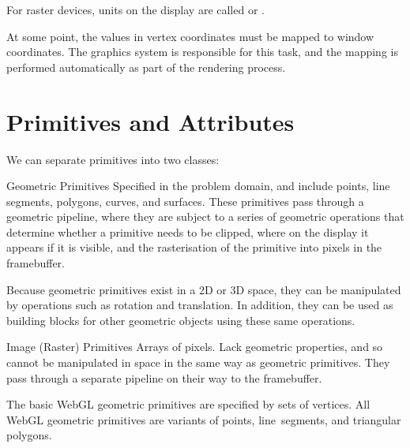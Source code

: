 \documentclass[../notes.tex]{subfiles}
\begin{document}
        For raster devices, units on the display are called 
        or .

        At some point, the values in vertex coordinates must be mapped to window coordinates.
        The graphics system is responsible for this task,
        and the mapping is performed automatically as part of the rendering process.

    \section{Primitives and Attributes}
      We can separate primitives into two classes:
      \begin{descriptimize}
        \item[Geometric Primitives] Specified in the problem domain,
          and include points, line segments, polygons, curves, and surfaces.
          These primitives pass through a geometric pipeline,
          where they are subject to a series of geometric operations that determine
          whether a primitive needs to be clipped,
          where on the display it appears if it is visible,
          and the rasterisation of the primitive into pixels in the framebuffer.

          Because geometric primitives exist in a 2D or 3D space, they can be manipulated
          by operations such as rotation and translation.
          In addition, they can be used as building blocks for other geometric objects
          using these same operations.
        \item[Image (Raster) Primitives] Arrays of pixels.
          Lack geometric properties, and so cannot be manipulated in space in the same way
          as geometric primitives.
          They pass through a separate pipeline on their way to the framebuffer.
      \end{descriptimize}

      The basic WebGL geometric primitives are specified by sets of vertices.
      All WebGL geometric primitives are variants of points, line~segments, and triangular polygons.
\end{document}
